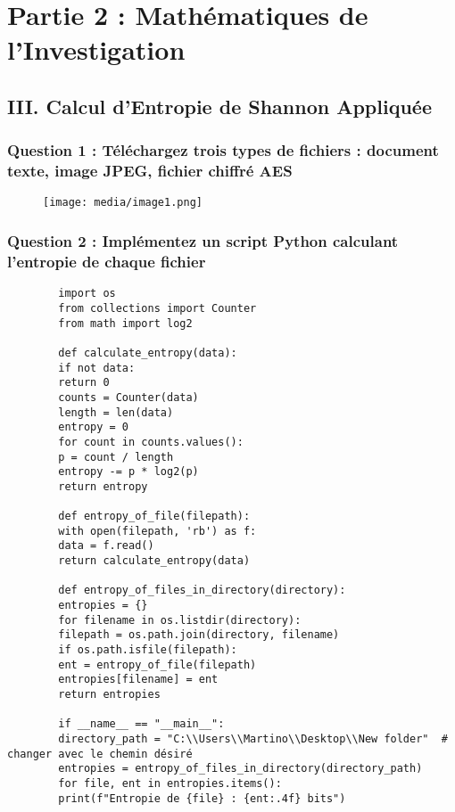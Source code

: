 \documentclass[12pt, a4paper]{article}
\begin{document}
	\section*{Partie 2 : Mathématiques de l'Investigation}
	
	\subsection*{III. Calcul d'Entropie de Shannon Appliquée}
	
	\subsubsection*{Question 1 : Téléchargez trois types de fichiers : document texte, image JPEG, fichier chiffré AES}
	
	\begin{figure}[H]
		\centering
		\texttt{[image: media/image1.png]}
	\end{figure}
	
	\subsubsection*{Question 2 : Implémentez un script Python calculant l'entropie de chaque fichier}
	
	\begin{verbatim}
		import os
		from collections import Counter
		from math import log2
		
		def calculate_entropy(data):
		if not data:
		return 0
		counts = Counter(data)
		length = len(data)
		entropy = 0
		for count in counts.values():
		p = count / length
		entropy -= p * log2(p)
		return entropy
		
		def entropy_of_file(filepath):
		with open(filepath, 'rb') as f:
		data = f.read()
		return calculate_entropy(data)
		
		def entropy_of_files_in_directory(directory):
		entropies = {}
		for filename in os.listdir(directory):
		filepath = os.path.join(directory, filename)
		if os.path.isfile(filepath):
		ent = entropy_of_file(filepath)
		entropies[filename] = ent
		return entropies
		
		if __name__ == "__main__":
		directory_path = "C:\\Users\\Martino\\Desktop\\New folder"  # changer avec le chemin désiré
		entropies = entropy_of_files_in_directory(directory_path)
		for file, ent in entropies.items():
		print(f"Entropie de {file} : {ent:.4f} bits")
	\end{verbatim}
	
\end{document}
